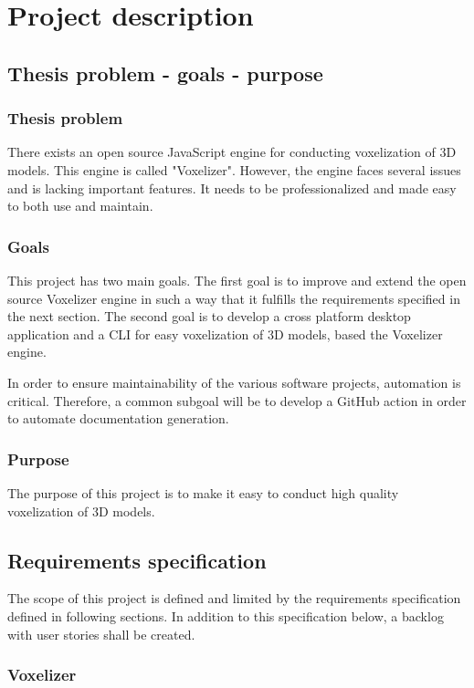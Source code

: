 \chapter{Project description}

\section{Thesis problem - goals - purpose}
\subsection{Thesis problem}
There exists an open source JavaScript engine for conducting voxelization of 3D models. This engine is called "Voxelizer". However, the engine faces several issues and is lacking important features. It needs to be professionalized and made easy to both use and maintain.

\subsection{Goals}
This project has two main goals. The first goal is to improve and extend the open source Voxelizer engine in such a way that it fulfills the requirements specified in the next section. The second goal is to develop a cross platform desktop application and a CLI for easy voxelization of 3D models, based the Voxelizer engine.

In order to ensure maintainability of the various software projects, automation is critical. Therefore, a common subgoal will be to develop a GitHub action in order to automate documentation generation.

\subsection{Purpose}
The purpose of this project is to make it easy to conduct high quality voxelization of 3D models.

\section{Requirements specification}
The scope of this project is defined and limited by the requirements specification defined in following sections. In addition to this specification below, a backlog with user stories shall be created.

\subsection{Voxelizer}

